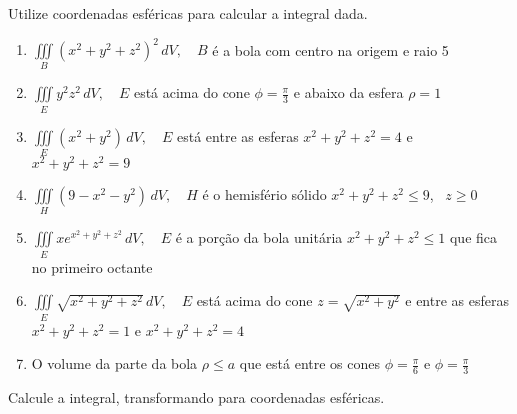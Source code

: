 \documentclass[a4paper, 12pt]{article}
\begin{document}
	
	
	\vspace{5mm}
	
	Utilize coordenadas esféricas para calcular a integral dada.
	
	\begin{enumerate}
		
		\item $\displaystyle \iiint \limits_{B} (x^2 + y^2 + z^2)^2 \, dV, \quad B$ é a bola com centro na origem e raio 5
		
		\item $\displaystyle \iiint \limits_{E} y^{2}z^{2} \, dV, \quad E$ está acima do cone $\phi = \frac{\pi}{3}$ e abaixo da esfera $\rho = 1$
		
		\item $\displaystyle \iiint \limits_{E} (x^2 + y ^2) \, dV, \quad E$ está entre as esferas $x^2 + y^2 + z^2 = 4$ e $x^2 + y^2 + z^2 = 9$
		
		\item $\displaystyle \iiint \limits_{H} (9 - x^2 - y ^2) \, dV, \quad H$ é o hemisfério sólido $x^2 + y^2 + z^2 \leq 9$, \, $z \geq 0$
		
		\item $\displaystyle \iiint \limits_{E} xe^{x^2 + y^2 + z^2} \, dV, \quad E$ é a porção da bola unitária $x^2 + y^2 + z^2 \leq 1$ que fica no primeiro octante
		
		\item $\displaystyle \iiint \limits_{E} \sqrt{x^2 + y^2 + z^2} \, dV, \quad E$ está acima do cone $z = \sqrt{x^2 + y^2}$ e entre as esferas $x^2 + y^2 + z^2 = 1$ e $x^2 + y^2 + z^2 = 4$
		
		\item O volume da parte da bola $\rho \leq a$ que está entre os cones $\phi = \frac{\pi}{6}$ e $\phi = \frac{\pi}{3}$

	\end{enumerate}
	
	\vspace{5mm}	
	
	Calcule a integral, transformando para coordenadas esféricas.
	
\end{document}
